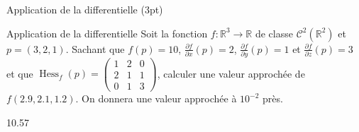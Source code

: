 \documentclass[12pt]{article}
\begin{document}
\begin{quiz}[points=3]
  {Application de la differentielle (3pt)}

 \begin{numerical}{Application de la differentielle}
     Soit la fonction $f:\mathbb R^3 \to \mathbb R$ de classe $\mathcal C^2(\mathbb R^2)$ et $p=(3,2,1)$. Sachant que $f(p) = 10$,  $\frac{\partial f}{\partial x}(p) = 2$,  $\frac{\partial f}{\partial y}(p) = 1$ et $\frac{\partial f}{\partial z}(p) = 3$ et que $\operatorname{Hess}_f(p) = \begin{pmatrix}
     1& 2& 0\\ 
     2& 1& 1\\
     0& 1& 3
 \end{pmatrix}$, calculer une valeur approch\'{e}e de $f(2.9,2.1,1.2)$. On donnera une valeur approch\'{e}e \`{a} $10^{-2}$ pr\`{e}s.
 \item 10.57
 \end{numerical}

\end{quiz}
\end{document}
